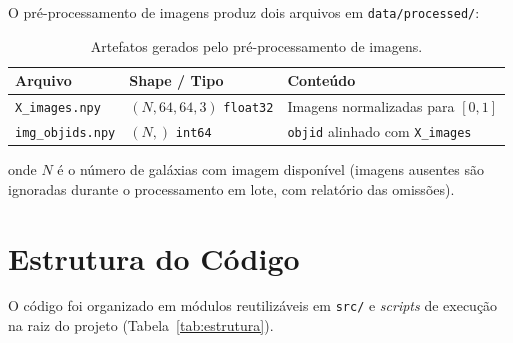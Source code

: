 \documentclass[12pt, a4paper]{article}
\begin{document}
O pré-processamento de imagens produz dois arquivos em \texttt{data/processed/}:

\begin{table}[H]
  \centering
  \caption{Artefatos gerados pelo pré-processamento de imagens.}
  \begin{tabular}{llp{7.5cm}}
    \toprule
    \textbf{Arquivo} & \textbf{Shape / Tipo} & \textbf{Conteúdo} \\
    \midrule
    \texttt{X\_images.npy}   & $(N, 64, 64, 3)$ \texttt{float32} & Imagens normalizadas para $[0,1]$ \\
    \texttt{img\_objids.npy} & $(N,)$ \texttt{int64}              & \texttt{objid} alinhado com \texttt{X\_images} \\
    \bottomrule
  \end{tabular}
\end{table}

onde $N$ é o número de galáxias com imagem disponível (imagens ausentes são
ignoradas durante o processamento em lote, com relatório das omissões).

\section{Estrutura do Código}

O código foi organizado em módulos reutilizáveis em \texttt{src/} e
\textit{scripts} de execução na raiz do projeto (Tabela~\ref{tab:estrutura}).
\end{document}
